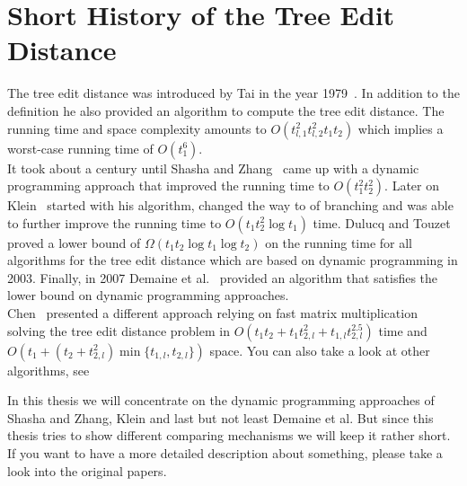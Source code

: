 \section{Short History of the Tree Edit Distance}
The tree edit distance was introduced by Tai in the year 1979~\cite{Tai}. In addition to the definition he also provided an algorithm to compute the tree edit distance. The running time and space complexity amounts to $O(t_{l,1}^2 t_{l,2}^2 t_1 t_2)$ which implies a worst-case running time of $O(t_1^6)$. \\
It took about a century until Shasha and Zhang~\cite{SasAndZha} came up with a dynamic programming approach that improved the running time to $O(t_1^2 t_2^2)$. Later on Klein~\cite{Kle} started with his algorithm, changed the way to of branching and was able to further improve the running time to $O(t_1 t_2^2 \log t_1)$ time. Dulucq and Touzet~\cite{DulAndTou} proved a lower bound of $\Omega(t_1 t_2 \log t_1 \log t_2)$ on the running time for all algorithms for the tree edit distance which are based on dynamic programming in 2003. Finally, in 2007 Demaine et al.~\cite{Dem} provided an algorithm that satisfies the lower bound on dynamic programming approaches.\\
Chen~\cite{Che} presented a different approach relying on fast matrix multiplication solving the tree edit distance problem in $O(t_1 t_2 + t_1 t_{2,l}^2 + t_{1,l}t_{2,l}^{2.5})$ time and $O(t_1 + (t_2 + t_{2,l}^2)\min \{t_{1,l},t_{2,l}\})$ space. You can also take a look at other algorithms, see~\cite{Apo, Bil, Val}

In this thesis we will concentrate on the dynamic programming approaches of Shasha and Zhang, Klein and last but not least Demaine et al. But since this thesis tries to show different comparing mechanisms we will keep it rather short. If you want to have a more detailed description about something, please take a look into the original papers.

